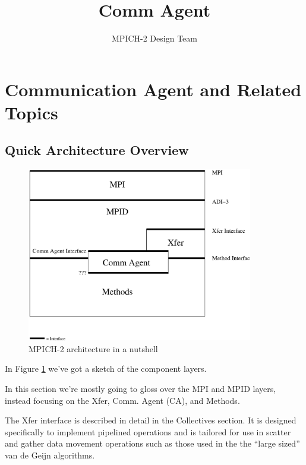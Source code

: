 \documentclass[11pt,letterpaper]{article}
\begin{document}
\date{}

\title{Comm Agent}

\author{MPICH-2 Design Team}

\maketitle

\thispagestyle{empty}

\section{Communication Agent and Related Topics}


\subsection{Quick Architecture Overview}

\begin{figure}
\begin{center}
\includegraphics[height=3in]{mpich2-arch.eps}
\caption{\label{fig:arch} MPICH-2 architecture in a nutshell}
\end{center}
\end{figure}


In Figure \ref{fig:arch} we've got a sketch of the component layers.

In this section we're mostly going to gloss over the MPI and MPID layers,
instead focusing on the Xfer, Comm. Agent (CA), and Methods.

The Xfer interface is described in detail in the Collectives section.  It is
designed specifically to implement pipelined operations and is tailored for use
in scatter and gather data movement operations such as those used in the the
``large sized'' van de Geijn algorithms.
\end{document}
